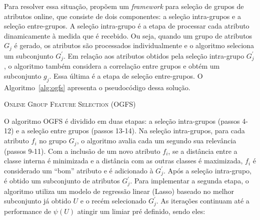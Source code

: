 Para resolver essa situação,  propõem um \textit{framework} para seleção de grupos de atributos online, que consiste de dois componentes: a seleção intra-grupos e a seleção entre-grupos. A seleção intra-grupo é a etapa de processar cada atributo dinamicamente à medida que é recebido. Ou seja, quando um grupo de atributos $G_j$ é gerado, os atributos são processados individualmente e o algoritmo seleciona um subconjunto $G_j^{'}$. Em relação aos atributos obtidos pela seleção intra-grupo $G_j^{'}$, o algoritmo também considera a correlação entre grupos e obtém um subconjunto $g_j$. Essa última é a etapa de seleção entre-grupos. O Algoritmo~\ref{alg:ogfs} apresenta o pseudocódigo dessa solução.

\bigskip

\begin{algorithm}[!htb]
   \SetAlgoLined
   
   \caption{\textsc{Online Group Feature Selection (OGFS)}}\label{alg:ogfs}
 \end{algorithm}
 
 \bigskip
 
 O algoritmo OGFS é dividido em duas etapas: a seleção intra-grupos (passos 4-12) e a seleção entre grupos (passos 13-14). Na seleção intra-grupos, para cada atributo $f_i$ no grupo $G_j$, o algoritmo avalia cada um segundo sua relevância (passos 9-11). Com a inclusão de um novo atributo $f_i$, se a distância entre a classe interna é minimizada e a distância com as outras classes é maximizada, $f_i$ é considerado um ``bom'' atributo e é adicionado à $G_j^{'}$. Após a seleção intra-grupo, é obtido um subconjunto de atributos $G_j^{'}$. Para implementar a segunda etapa, o algoritmo utiliza um modelo de regressão linear (Lasso) baseado no melhor subconjunto já obtido $U$ e o recém selecionado $G_j^{'}$. As iterações continuam até a performance de $ \psi (U) $ atingir um limiar pré definido, sendo eles: 
 
